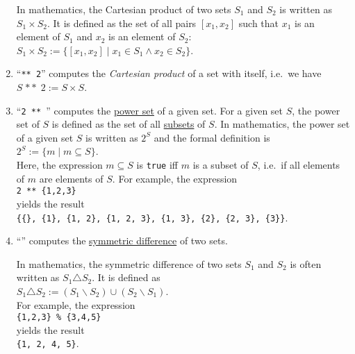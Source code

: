 \begin{enumerate}
      In mathematics, the Cartesian product of two sets $S_1$ and $S_2$ is written
      as $S_1 \times S_2$.  It is defined as the set of all pairs $[x_1,x_2]$ such that $x_1$ is an
      element of $S_1$ and $x_2$ is an element of $S_2$:
      \\[0.2cm]
      \hspace*{1.3cm}
      $S_1 \times S_2 := \{ [x_1,x_2] \mid x_1 \in S_1 \wedge x_2 \in S_2 \}$.
\item ``\texttt{** 2}'' computes the \emph{Cartesian product} of a set with itself,
      i.e.~we have 
      \\[0.2cm]
      \hspace*{1.3cm}
      $S \;\mathtt{**}\; 2 := S \times S$.
\item ``\texttt{2 ** }'' computes the \href{https://en.wikipedia.org/wiki/Power_set}{power set} of a given set.
      For a given set $S$, the power set of $S$ is defined as the set of all
      \href{https://en.wikipedia.org/wiki/Subset}{subsets} of $S$. In mathematics, the power set of a given set
      $S$ is written as $2^S$ and the formal definition is
      \\[0.2cm]
      \hspace*{1.3cm}
      $2^S := \{ m \mid m \subseteq S \}$.
      \\[0.2cm]
      Here, the expression $m \subseteq S$ is \texttt{true} iff $m$ is a subset of $S$, i.e.~if all elements of
      $m$ are elements of $S$.  For example, the expression
      \\[0.2cm]
      \hspace*{1.3cm}
      \texttt{2 ** \{1,2,3\}}
      \\[0.2cm]
      yields the result
      \\[0.2cm]
      \hspace*{1.3cm}
      \texttt{\{\{\}, \{1\}, \{1, 2\}, \{1, 2, 3\}, \{1, 3\}, \{2\}, \{2, 3\}, \{3\}\}}.
\item ``\texttt{}'' computes the \href{https://en.wikipedia.org/wiki/Symmetric_difference}{symmetric
      difference} of two sets. 

      In mathematics, the symmetric difference of two sets $S_1$ and $S_2$ is often written
      as $S_1 \triangle S_2$.  It is defined as
      \\[0.2cm]
      \hspace*{1.3cm}
      $S_1 \triangle S_2 := (S_1 \backslash S_2) \cup (S_2 \backslash S_1)$.
      \\[0.2cm]
      For example, the expression
      \\[0.2cm]
      \hspace*{1.3cm}
      \texttt{\{1,2,3\} \% \{3,4,5\}}
      \\[0.2cm]
      yields the result
      \\[0.2cm]
      \hspace*{1.3cm}
      \texttt{\{1, 2, 4, 5\}}.
\end{enumerate}
